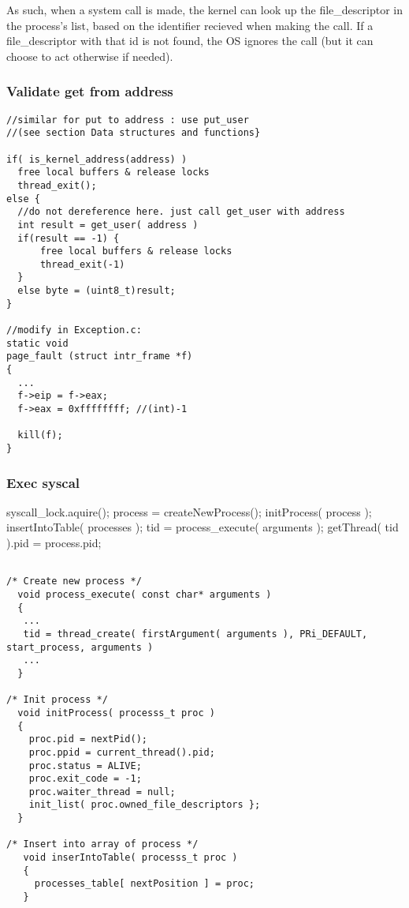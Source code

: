    As such, when a system call is made, the kernel can look up the file\_descriptor in the process's list, based on the identifier recieved when making the call. If a file\_descriptor with that id is not found, the OS ignores the call (but it can choose to act otherwise if needed).

    \subsubsection{Validate get from address}
    \vspace{-1em} %
      \begin{lstlisting}
//similar for put to address : use put_user
//(see section Data structures and functions}

if( is_kernel_address(address) )
  free local buffers & release locks
  thread_exit(); 
else {
  //do not dereference here. just call get_user with address
  int result = get_user( address ) 
  if(result == -1) {
      free local buffers & release locks
      thread_exit(-1)
  }	
  else byte = (uint8_t)result;
}

//modify in Exception.c:
static void
page_fault (struct intr_frame *f)
{
  ...
  f->eip = f->eax;
  f->eax = 0xffffffff; //(int)-1
  
  kill(f);
}
      \end{lstlisting}

    \subsubsection{Exec syscal}
    \vspace{-3em}
    \begin{program}
      syscall\_lock.aquire();
      process = createNewProcess();
      initProcess( process );
      insertIntoTable( processes );
      tid = process\_execute( arguments );
      getThread( tid ).pid = process.pid;
    \end{program}

    \begin{lstlisting}
    
/* Create new process */
  void process_execute( const char* arguments )
  {
   ...
   tid = thread_create( firstArgument( arguments ), PRi_DEFAULT, start_process, arguments )
   ...
  }

/* Init process */
  void initProcess( processs_t proc )
  {
    proc.pid = nextPid();
    proc.ppid = current_thread().pid;
    proc.status = ALIVE;
    proc.exit_code = -1;
    proc.waiter_thread = null;
    init_list( proc.owned_file_descriptors };
  }

/* Insert into array of process */
   void inserIntoTable( processs_t proc )
   {
     processes_table[ nextPosition ] = proc;
   }
    
    \end{lstlisting}

